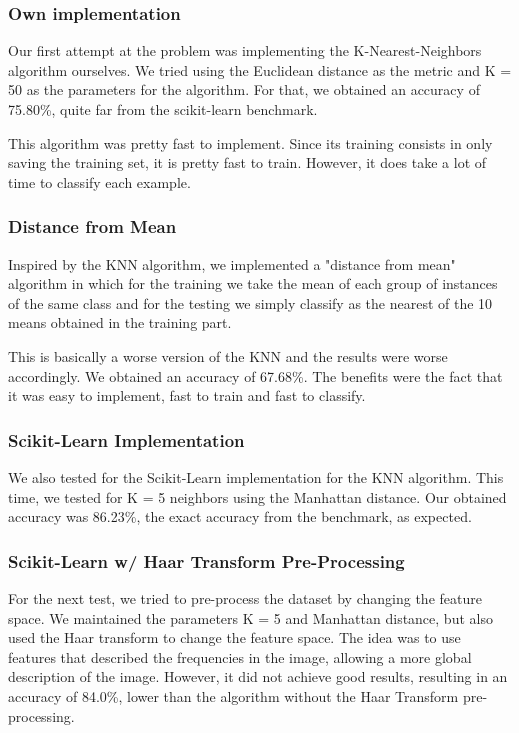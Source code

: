\documentclass[twoside,twocolumn]{article}
\begin{document}
\subsubsection{Own implementation}

Our first attempt at the problem was implementing the K-Nearest-Neighbors algorithm ourselves.
We tried using the Euclidean distance as the metric and K = 50 as the parameters for the algorithm.
For that, we obtained an accuracy of 75.80\%, quite far from the scikit-learn benchmark.

This algorithm was pretty fast to implement.
Since its training consists in only saving the training set, it is pretty fast to train.
However, it does take a lot of time to classify each example.

\subsubsection{Distance from Mean}

Inspired by the KNN algorithm, we implemented a "distance from mean" algorithm in which for the training we
take the mean of each group of instances of the same class and for the testing we simply classify as the nearest
of the 10 means obtained in the training part.

This is basically a worse version of the KNN and the results were worse accordingly.
We obtained an accuracy of 67.68\%.
The benefits were the fact that it was easy to implement, fast to train and fast to classify.

\subsubsection{Scikit-Learn Implementation}

We also tested for the Scikit-Learn implementation for the KNN algorithm.
This time, we tested for K = 5 neighbors using the Manhattan distance.
Our obtained accuracy was 86.23\%, the exact accuracy from the benchmark, as expected.

\subsubsection{Scikit-Learn w/ Haar Transform Pre-Processing}

For the next test, we tried to pre-process the dataset by changing the feature space. We  maintained the parameters K = 5 and
Manhattan distance, but also used the Haar transform to change the feature space. The idea was to use features that described the frequencies
in the image, allowing a more global description of the image. However, it did not achieve good results, resulting in an accuracy of 84.0\%, lower than
the algorithm without the Haar Transform pre-processing.
\end{document}
